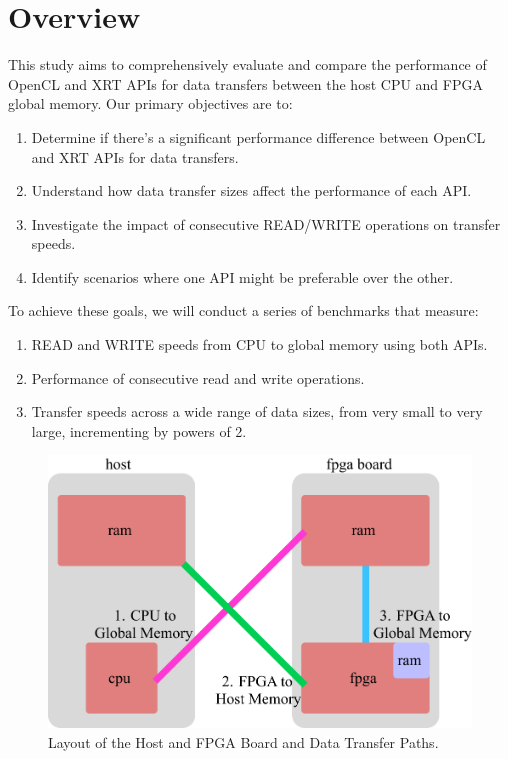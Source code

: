 \section{Overview}

This study aims to comprehensively evaluate and compare the performance of OpenCL and XRT APIs for data transfers between the host CPU and FPGA global memory. Our primary objectives are to: \\

\begin{enumerate}
    \item Determine if there's a significant performance difference between OpenCL and XRT APIs for data transfers.
    \item Understand how data transfer sizes affect the performance of each API.
    \item Investigate the impact of consecutive READ/WRITE operations on transfer speeds.
    \item Identify scenarios where one API might be preferable over the other.
\end{enumerate}

To achieve these goals, we will conduct a series of benchmarks that measure: \\
\begin{enumerate}
    \item READ and WRITE speeds from CPU to global memory using both APIs.
    \item Performance of consecutive read and write operations.
    \item Transfer speeds across a wide range of data sizes, from very small to very large, incrementing by powers of 2.
\end{enumerate}

\begin{figure}[H]
    \centering
    \includegraphics[width=0.6\linewidth]{content/cpu_fpga_board_layout.png}
    \caption{Layout of the Host and FPGA Board and Data Transfer Paths.}
    \label{fig:enter-label}
\end{figure}

